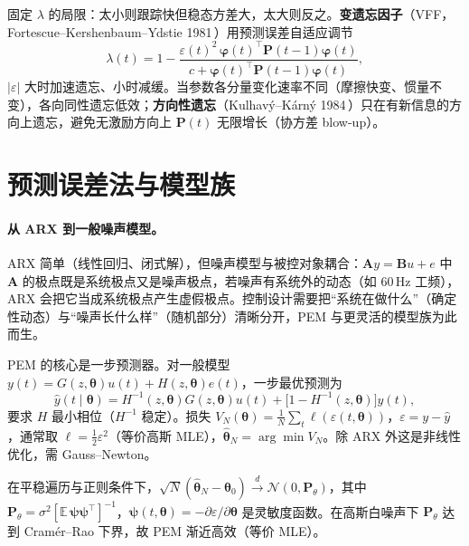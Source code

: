 固定 $\lambda$ 的局限：太小则跟踪快但稳态方差大，太大则反之。\textbf{变遗忘因子}（VFF，Fortescue--Kershenbaum--Ydstie 1981\,\cite{fortescue1981vff}）用预测误差自适应调节
\begin{equation}
  \lambda(t)=1-\frac{\varepsilon(t)^2\,\boldsymbol\varphi(t)^\top\mathbf P(t-1)\boldsymbol\varphi(t)}{c+\boldsymbol\varphi(t)^\top\mathbf P(t-1)\boldsymbol\varphi(t)},
\end{equation}
$|\varepsilon|$ 大时加速遗忘、小时减缓。当参数各分量变化速率不同（摩擦快变、惯量不变），各向同性遗忘低效；\textbf{方向性遗忘}（Kulhavý--Kárný 1984\,\cite{kulhavy1984directional}）只在有新信息的方向上遗忘，避免无激励方向上 $\mathbf P(t)$ 无限增长（协方差 blow-up）。

\section{预测误差法与模型族}
\label{sec:pem}

\paragraph{从 ARX 到一般噪声模型。}
ARX 简单（线性回归、闭式解），但噪声模型与被控对象耦合：$\mathbf A y=\mathbf B u+e$ 中 $\mathbf A$ 的极点既是系统极点又是噪声极点，若噪声有系统外的动态（如 $60\,$Hz 工频），ARX 会把它当成系统极点产生虚假极点。控制设计需要把“系统在做什么”（确定性动态）与“噪声长什么样”（随机部分）清晰分开，PEM 与更灵活的模型族为此而生。

PEM 的核心是一步预测器。对一般模型 $y(t)=G(z,\boldsymbol\theta)u(t)+H(z,\boldsymbol\theta)e(t)$，一步最优预测为
\begin{equation}
  \hat y(t\mid\boldsymbol\theta)=H^{-1}(z,\boldsymbol\theta)G(z,\boldsymbol\theta)u(t)+\big[1-H^{-1}(z,\boldsymbol\theta)\big]y(t),
  \label{eq:pem-predictor}
\end{equation}
要求 $H$ 最小相位（$H^{-1}$ 稳定）。损失 $V_N(\boldsymbol\theta)=\tfrac1N\sum_t\ell(\varepsilon(t,\boldsymbol\theta))$，$\varepsilon=y-\hat y$，通常取 $\ell=\tfrac12\varepsilon^2$（等价高斯 MLE），$\hat{\boldsymbol\theta}_N=\arg\min V_N$。除 ARX 外这是非线性优化，需 Gauss--Newton。

\begin{theorem}
\label{thm:pem-crlb}
在平稳遍历与正则条件下，$\sqrt N(\hat{\boldsymbol\theta}_N-\boldsymbol\theta_0)\xrightarrow{d}\mathcal N(0,\mathbf P_\theta)$，其中 $\mathbf P_\theta=\sigma^2[\mathbb E\,\boldsymbol\psi\boldsymbol\psi^\top]^{-1}$，$\boldsymbol\psi(t,\boldsymbol\theta)=-\partial\varepsilon/\partial\boldsymbol\theta$ 是灵敏度函数。在高斯白噪声下 $\mathbf P_\theta$ 达到 Cramér--Rao 下界，故 PEM 渐近高效（等价 MLE）。
\end{theorem}

